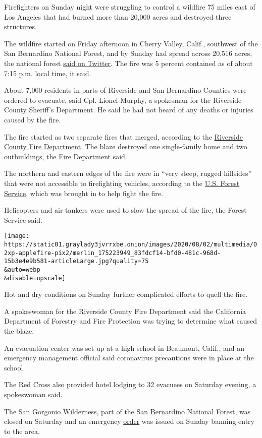 Firefighters on Sunday night were struggling to control a wildfire 75
miles east of Los Angeles that had burned more than 20,000 acres and
destroyed three structures.

The wildfire started on Friday afternoon in Cherry Valley, Calif.,
southwest of the San Bernardino National Forest, and by Sunday had
spread across 20,516 acres, the national forest
\href{https://twitter.com/SanBernardinoNF/status/1289968204933029888?s=20}{said
on Twitter}. The fire was 5 percent contained as of about 7:15 p.m.
local time, it said.

About 7,000 residents in parts of Riverside and San Bernardino Counties
were ordered to evacuate, said Cpl. Lionel Murphy, a spokesman for the
Riverside County Sheriff's Department. He said he had not heard of any
deaths or injuries caused by the fire.

The fire started as two separate fires that merged, according to the
\href{http://www.rvcfire.org/_Layouts/Incident\%20Information/IncidentInfoDetail.aspx?4558}{Riverside
County Fire Department}. The blaze destroyed one single-family home and
two outbuildings, the Fire Department said.

The northern and eastern edges of the fire were in ``very steep, rugged
hillsides'' that were not accessible to firefighting vehicles, according
to the \href{https://inciweb.nwcg.gov/incident/6902/}{U.S. Forest
Service}, which was brought in to help fight the fire.

Helicopters and air tankers were used to slow the spread of the fire,
the Forest Service said.

\texttt{[image: https://static01.graylady3jvrrxbe.onion/images/2020/08/02/multimedia/02xp-applefire-pix2/merlin\_175223949\_83fdcf14-bfd0-481c-968d-15b3e4e9b581-articleLarge.jpg?quality=75\\\&auto=webp\\\&disable=upscale]}

Hot and dry conditions on Sunday further complicated efforts to quell
the fire.

A spokeswoman for the Riverside County Fire Department said the
California Department of Forestry and Fire Protection was trying to
determine what caused the blaze.

An evacuation center was set up at a high school in Beaumont, Calif.,
and an emergency management official said coronavirus precautions were
in place at the school.

The Red Cross also provided hotel lodging to 32 evacuees on Saturday
evening, a spokeswoman said.

The San Gorgonio Wilderness, part of the San Bernardino National Forest,
was closed on Saturday and an emergency
\href{https://inciweb.nwcg.gov/photos/CABDF/2020-08-01-1443-Apple-fire/related_files/pict20200702-002517-0.pdf}{order}
was issued on Sunday banning entry to the area.

